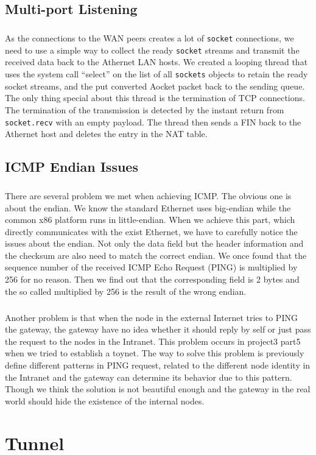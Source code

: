     \subsection{Multi-port Listening}
        \subparagraph{}
        As the connections to the WAN peers creates a lot of {\tt socket} connections, we need to use a simple way to collect the ready {\tt socket} streams and transmit the received data back to the Athernet LAN hosts. We created a looping thread that uses the system call ``select'' on the list of all {\tt sockets} objects to retain the ready socket streams, and the put converted Aocket packet back to the sending queue. The only thing special about this thread is the termination of TCP connections. The termination of the transmission is detected by the instant return from {\tt socket.recv} with an empty payload. The thread then sends a FIN back to the Athernet host and deletes the entry in the NAT table.
        
    \subsection{ICMP Endian Issues}
    \subparagraph{}
    There are several problem we met when achieving ICMP. The obvious one is about the endian. We know the standard Ethernet uses big-endian while the common x86 platform runs in little-endian. When we achieve this part, which directly communicates with the exist Ethernet, we have to carefully notice the issues about the endian. Not only the data field but the header information and the checksum are also need to match the correct endian. We once found that the sequence number of the received ICMP Echo Request (PING) is multiplied by 256 for no reason. Then we find out that the corresponding field is 2 bytes and the so called multiplied by 256 is the result of the wrong endian.
    \subparagraph{}
    Another problem is that when the node in the external Internet tries to PING the gateway, the gateway have no idea whether it should reply by self or just pass the request to the nodes in the Intranet. This problem occurs in project3 part5 when we tried to establish a toynet. The way to solve this problem is previously define different patterns in PING request, related to the different node identity in the Intranet and the gateway can determine its behavior due to this pattern. Though we think the solution is not beautiful enough and the gateway in the real world should hide the existence of the internal nodes.

\section{Tunnel}
    \subparagraph{}
    
